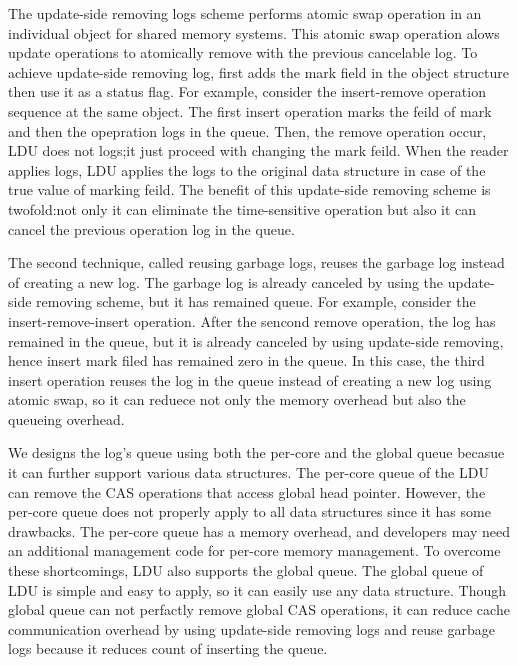 The update-side removing logs scheme performs atomic swap operation in an
individual object for shared memory systems.
This atomic swap operation alows update operations to atomically remove with the
previous cancelable log.
To achieve update-side removing log, first adds the mark field in the object
structure then use it as a status flag. 
For example, consider the insert-remove operation sequence at the same object.
The first insert operation marks the feild of mark and then the opepration logs
in the queue.
Then, the remove operation occur, LDU does not logs;it just proceed with
changing the mark feild.
When the reader applies logs, LDU applies the logs to the original data
structure in case of the true value of marking feild.
The benefit of this update-side removing scheme is twofold:not only it can
eliminate the time-sensitive operation but also it can cancel the previous
operation log in the queue.


The second technique, called reusing garbage logs, reuses the garbage log
instead of creating a new log.
The garbage log is already canceled by using the update-side removing scheme,
but it has remained queue.
For example, consider the insert-remove-insert operation.
After the sencond remove operation, the log has remained in the queue, but it is 
already canceled by using update-side removing, hence insert mark filed
has remained zero in the queue.
In this case, the third insert operation reuses the log in the queue instead of 
creating a new log using atomic swap, so it can reduece not only the memory
overhead but also the queueing overhead.

We designs the log's queue using both the per-core and the global queue becasue
it can further support various data structures.
The per-core queue of the LDU can remove the CAS operations that access global
head pointer. 
However, the per-core queue does not properly apply to all data structures since
it has some drawbacks.
The per-core queue has a memory overhead, and developers may need
an additional management code for per-core memory management.
To overcome these shortcomings, LDU also supports the global queue.
The global queue of LDU is simple and easy to apply, so it can easily use any
data structure.
Though global queue can not perfactly remove global CAS operations, it can
reduce cache communication overhead by using update-side removing
logs and reuse garbage logs because it reduces count of inserting the
queue.

